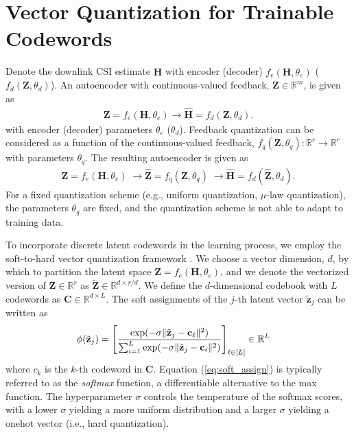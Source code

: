 \section{Vector Quantization for Trainable Codewords}
Denote the downlink CSI estimate $\mathbf{\hat{H}}$ 
with encoder (decoder) $f_{e}(\mathbf H, \theta_e)$ ($f_{d}(\mathbf Z, \theta_d)$).
An autoencoder with continuous-valued feedback, $\mathbf Z \in \mathbb R^{m}$, is given as
\begin{align*}
	\mathbf Z = f_e(\mathbf H, \theta_e) \to
	\hat{\mathbf H} = f_d(\mathbf Z, \theta_d).
\end{align*}
with encoder (decoder) parameters $\theta_e$ ($\theta_d$). Feedback quantization can be considered as a function of the continuous-valued feedback, $f_q(\mathbf Z, \theta_q) : \mathbb R^r \to \mathbb R^r$ with parameters $\theta_q$. The resulting autoencoder is given as
\begin{align*}
	\mathbf Z = f_e(\mathbf H, \theta_e)\; \to
	\hat{\mathbf Z} = f_q(\mathbf Z, \theta_q)\; \to
	\hat{\mathbf H} = f_d(\hat{\mathbf Z}, \theta_d).
\end{align*}
For a fixed quantization scheme (e.g., uniform quantization, $\mu$-law quantization), the parameters $\theta_q$ are fixed, and the quantization scheme is not able to adapt to training data.

To incorporate discrete latent codewords in the learning process, we employ the soft-to-hard vector quantization framework \cite{ref:Agustsson2017SoftToHard}. We choose a vector dimension, $d$, by which to partition the latent space $\mathbf Z = f_e(\mathbf H, \theta_e)$, and we denote the vectorized version of $\mathbf Z \in \mathbb R^{r}$ as $\tilde{\mathbf Z} \in \mathbb R^{d \times r/d}$. We define the $d$-dimensional codebook with $L$ codewords as $\mathbf C \in \mathbb R^{d \times L}$. The soft assignments of the $j$-th latent vector $\tilde{\mathbf z}_j$ can be written as
\begin{align}
\phi(\tilde{\mathbf z}_j) &= \left[\frac{\text{exp}(-\sigma \Arrowvert \tilde{\mathbf z}_j - \mathbf c_\ell\Arrowvert^2)}{\sum_{i=1}^L\text{exp}(-\sigma \Arrowvert \tilde{\mathbf z}_j - \mathbf c_i\Arrowvert^2)}\right]_{\ell\in [L]} \in \mathbb R^L \label{eq:soft_assign}
\end{align}
where $c_k$ is the $k$-th codeword in $\mathbf C$. Equation (\ref{eq:soft_assign}) is typically referred to as the \emph{softmax} function, a differentiable alternative to the max function. The hyperparameter $\sigma$ controls the temperature of the softmax scores, with a lower $\sigma$ yielding a more uniform distribution and a larger $\sigma$ yielding a onehot vector (i.e., hard quantization). %


